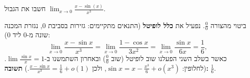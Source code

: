 
\begin{question}
חשבו את הגבול $\displaystyle\lim_{x\to0}\frac{x-\sin(x)}{x^3}$.
\end{question}

\begin{solution}
ביטוי מהצורה $\frac00$. נפעיל את \textbf{כלל לופיטל} (התנאים מתקיימים: גזירות בסביבת $0$, נגזרת המכנה שונה מ-$0$ ליד $0$):
\[ \lim_{x\to0}\frac{x-\sin x}{x^3}=\lim_{x\to0}\frac{1-\cos x}{3x^2}=\lim_{x\to0}\frac{\sin x}{6x}=\frac16, \]
כאשר בשלב השני הפעלנו שוב לופיטל (שוב $\frac00$) ובאחרון השתמשנו ב-$\lim\frac{\sin x}{x}=1$.
(לחלופין: $\sin x=x-\frac{x^3}{6}+o(x^3)$, ולכן $\frac{x-\sin x}{x^3}=\frac16+o(1)$.) \textbf{תשובה:} $\frac16$.
\end{solution}
